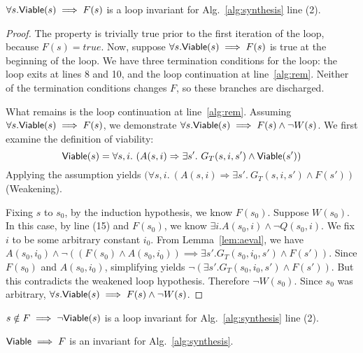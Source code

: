 \begin{lemma}
$\forall s. {\mathsf {Viable}}(s) \implies F(s)$ is a loop invariant for Alg.~\ref{alg:synthesis} line (2).
\label{lem:alg1-viable}
\end{lemma}

\begin{proof}
The property is trivially true prior to the first iteration of the loop, because
$F(s) = true$.  Now, suppose $\forall s . {\mathsf {Viable}}(s) \implies F(s)$ is true at the beginning of the loop.  We have three termination conditions for the loop: the loop exits at lines 8 and 10, and the loop continuation at line~\ref{alg:rem}.  Neither of the termination conditions changes $F$, so these branches are discharged.

What remains is the loop continuation at line~\ref{alg:rem}.  Assuming $\forall s . {\mathsf {Viable}}(s) \implies F(s)$, we demonstrate $\forall s . {\mathsf {Viable}}(s) \implies F(s) \land \lnot W(s)$.  We first examine the definition of viability:
\[
    {\mathsf {Viable}}(s) = \forall s,i. \ (A(s, i) \Rightarrow \exists s'.~ G_T(s, i,s') \land {\mathsf {Viable}}(s'))
\]
Applying the assumption yields $(\forall s,i. \ (A(s, i) \Rightarrow \exists s'.~ G_T(s, i,s') \land F(s'))$ (Weakening).

Fixing $s$ to $s_0$, by the induction hypothesis, we know $F(s_0)$.  Suppose $W(s_0)$.  In this case, by line (15) and $F(s_0)$, we know $\exists i. A(s_0, i) \land \lnot Q(s_0, i)$.  We fix $i$ to be some arbitrary constant $i_0$.  From Lemma~\ref{lem:aeval}, we have
$A(s_0, i_0) \land \lnot ((F(s_0) \land A(s_0,i_0)) \implies \exists s'.G_{T}(s_0,i_0,s') \land F(s'))$.  Since $F(s_0)$ and $A(s_0, i_0)$, simplifying
yields $\lnot (\exists s'.G_{T}(s_0,i_0,s') \land F(s'))$.  But this contradicts the weakened loop hypothesis.  Therefore $\lnot W(s_0)$.  Since $s_0$ was arbitrary, $\forall s . {\mathsf {Viable}}(s) \implies F(s) \land \lnot W(s)$.
\end{proof}

\begin{corollary}
$s \notin F \implies \lnot {\mathsf {Viable}}(s)$ is a loop invariant for Alg.~\ref{alg:synthesis} line (2).
\label{cor:alg1-nonviable}
\end{corollary}
\fi


\begin{lemma}
  ${\mathsf {Viable}} \implies F$ is an invariant for
  Alg.~\ref{alg:synthesis}.
\label{lem:alg1-viable}
\end{lemma}

